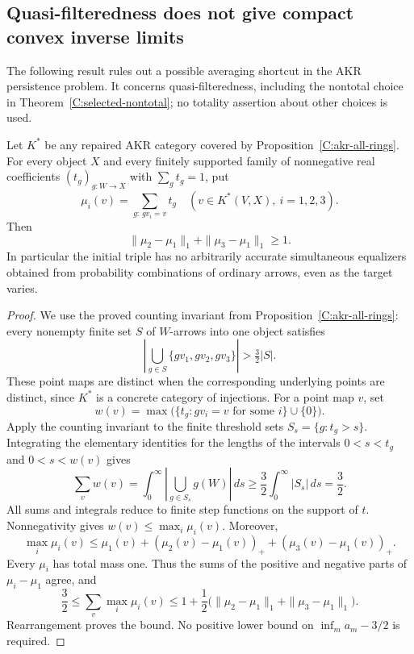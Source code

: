 \subsection{Quasi-filteredness does not give compact convex inverse limits}

The following result rules out a possible averaging shortcut in the
AKR persistence problem. It concerns quasi-filteredness, including
the nontotal choice in Theorem~\ref{C:selected-nontotal}; no totality
assertion about other choices is used.

\begin{proposition}
\label{CC:positive-gap}
Let $K^*$ be any repaired AKR category covered by
Proposition~\ref{C:akr-all-rings}. For every object $X$ and every
finitely supported family of nonnegative real coefficients
$(t_g)_{g:W\to X}$ with $\sum_g t_g=1$, put
\[
 \mu_i(v)=\sum_{g:\,gv_i=v}t_g\quad
 (v\in K^*(V,X),\ i=1,2,3).
\]
Then
\[
 \|\mu_2-\mu_1\|_1+\|\mu_3-\mu_1\|_1\geq1.
\]
In particular the initial triple has no arbitrarily accurate
simultaneous equalizers obtained from probability combinations of
ordinary arrows, even as the target varies.
\end{proposition}
\begin{proof}
We use the proved counting invariant from
Proposition~\ref{C:akr-all-rings}: every nonempty finite set $S$ of
$W$-arrows into one object satisfies
\[
 \left|\bigcup_{g\in S}\{gv_1,gv_2,gv_3\}\right|>\tfrac32|S|.
\]
These point maps are distinct when the corresponding underlying points
are distinct, since $K^*$ is a concrete category of injections.
For a point map $v$, set
\[
 w(v)=\max\bigl(\{t_g:gv_i=v\text{ for some }i\}\cup\{0\}\bigr).
\]
Apply the counting invariant to the finite threshold sets
$S_s=\{g:t_g>s\}$. Integrating the elementary identities for the
lengths of the intervals $0<s<t_g$ and $0<s<w(v)$ gives
\[
 \sum_v w(v)
 =\int_0^\infty\left|\bigcup_{g\in S_s}g(W)\right|\,ds
 \geq\frac32\int_0^\infty|S_s|\,ds
 =\frac32.
\]
All sums and integrals reduce to finite step functions on the support
of $t$. Nonnegativity gives
$w(v)\leq\max_i\mu_i(v)$. Moreover,
\[
 \max_i\mu_i(v)\leq
 \mu_1(v)+(\mu_2(v)-\mu_1(v))_+
              +(\mu_3(v)-\mu_1(v))_+.
\]
Every $\mu_i$ has total mass one. Thus the sums of the positive and
negative parts of $\mu_i-\mu_1$ agree, and
\[
 \frac32\leq\sum_v\max_i\mu_i(v)
 \leq1+\frac12\bigl(
 \|\mu_2-\mu_1\|_1+\|\mu_3-\mu_1\|_1\bigr).
\]
Rearrangement proves the bound. No positive lower bound on
$\inf_m a_m-3/2$ is required.
\end{proof}

